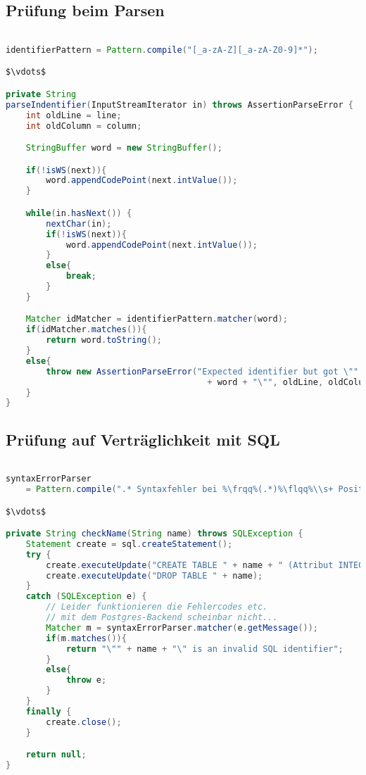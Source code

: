 \documentclass[a4paper]{article}
\begin{document}
\subsection{Prüfung beim Parsen}
\begin{lstlisting}[language=java,mathescape=true]

identifierPattern = Pattern.compile("[_a-zA-Z][_a-zA-Z0-9]*");

$\vdots$

private String
parseIndentifier(InputStreamIterator in) throws AssertionParseError {
    int oldLine = line;
    int oldColumn = column;

    StringBuffer word = new StringBuffer();

    if(!isWS(next)){
        word.appendCodePoint(next.intValue());
    }

    while(in.hasNext()) {
        nextChar(in);
        if(!isWS(next)){
            word.appendCodePoint(next.intValue());
        }
        else{
            break;
        }
    }

    Matcher idMatcher = identifierPattern.matcher(word);
    if(idMatcher.matches()){
        return word.toString();
    }
    else{
        throw new AssertionParseError("Expected identifier but got \""
                                        + word + "\"", oldLine, oldColumn);
    }
}
\end{lstlisting}

\subsection{Prüfung auf Verträglichkeit mit SQL}
\begin{lstlisting}[language=java,mathescape=true,escapechar=\%]

syntaxErrorParser
    = Pattern.compile(".* Syntaxfehler bei %\frqq%(.*)%\flqq%\\s+ Position: (\\d+).*");

$\vdots$

private String checkName(String name) throws SQLException {
    Statement create = sql.createStatement();
    try {
        create.executeUpdate("CREATE TABLE " + name + " (Attribut INTEGER)");
        create.executeUpdate("DROP TABLE " + name);
    }
    catch (SQLException e) {
        // Leider funktionieren die Fehlercodes etc.
        // mit dem Postgres-Backend scheinbar nicht...
        Matcher m = syntaxErrorParser.matcher(e.getMessage());
        if(m.matches()){
            return "\"" + name + "\" is an invalid SQL identifier";
        }
        else{
            throw e;
        }
    }
    finally {
        create.close();
    }

    return null;
}
\end{lstlisting}
\end{document}
